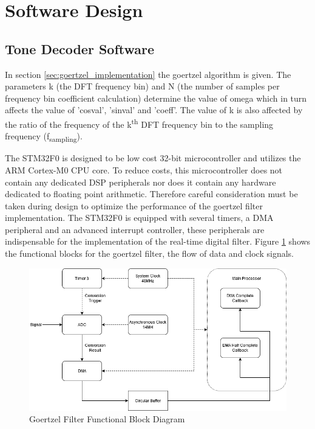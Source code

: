 


\section{Software Design}

\subsection{Tone Decoder Software}
\label{tone_decoder_software}

In section \ref{sec:goertzel_implementation} the goertzel algorithm is given. The parameters k (the DFT frequency bin) and N (the number of samples per frequency bin coefficient calculation) determine the value of omega which in turn affects the value of 'cosval', 'sinval' and 'coeff'. The value of k is also affected by the ratio of the frequency of the k\textsuperscript{th} DFT frequency bin to the sampling frequency (f\textsubscript{sampling}).

The STM32F0 is designed to be low cost 32-bit microcontroller and utilizes the ARM Cortex-M0 CPU core. To reduce costs, this microcontroller does not contain any dedicated DSP peripherals nor does it contain any hardware dedicated to floating point arithmetic. Therefore careful consideration must be taken during design to optimize the performance of the goertzel filter implementation. The STM32F0 is equipped with several timers, a DMA peripheral and an advanced interrupt controller, these peripherals are indispensable for the implementation of the real-time digital filter. Figure \ref{fig:goertzel_functional_diagram} shows the functional blocks for the goertzel filter, the flow of data and clock signals.

\begin{figure}[H]
	\centering
	\includegraphics[width=.8\textwidth]{figures/design/goertzel_filter_functional.png}
	\caption{Goertzel Filter Functional Block Diagram}
	\label{fig:goertzel_functional_diagram}
\end{figure}

